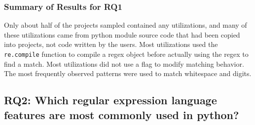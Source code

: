 





% 


\subsubsection{Summary of Results for RQ1}
Only about half of the projects sampled contained any utilizations, and many of these utilizations came from python module source code that had been copied into projects, not code written by the users.  Most utilizations used the {\tt re.compile} function to compile a regex object before actually using the regex to find a match.  Most utilizations did not use a flag to modify matching behavior.  The most frequently observed patterns were used to match whitespace and digits.

\subsection{RQ2: Which regular expression language features are most commonly used in python?}
\label{results:re2}

